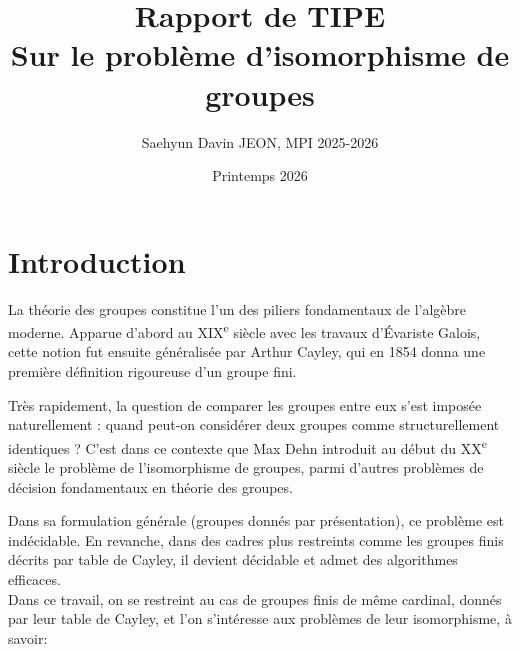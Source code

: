 \documentclass[12pt]{article}
\title{Rapport de TIPE \\
Sur le problème d'isomorphisme de groupes}
\author{Saehyun Davin JEON, MPI 2025-2026}
\date{Printemps 2026}
\begin{document}
\maketitle

\renewcommand{\contentsname}{Sommaire}
\tableofcontents

\newpage

\section{Introduction}

La théorie des groupes constitue l'un des piliers fondamentaux de l'algèbre moderne. 
Apparue d'abord au XIX\textsuperscript{e} siècle avec les travaux d'Évariste Galois, cette notion fut ensuite généralisée par Arthur Cayley, qui en 1854 donna une première définition rigoureuse d'un groupe fini.

Très rapidement, la question de comparer les groupes entre eux s’est imposée naturellement : quand peut-on considérer deux groupes comme structurellement identiques ? C’est dans ce contexte que Max Dehn introduit au début du XX\textsuperscript{e} siècle le problème de l’isomorphisme de groupes, parmi d’autres problèmes de décision fondamentaux en théorie des groupes.

Dans sa formulation générale (groupes donnés par présentation), ce problème est indécidable. En revanche, dans des cadres plus restreints comme les groupes finis décrits par table de Cayley, il devient décidable et admet des algorithmes efficaces. \\

Dans ce travail, on se restreint au cas de groupes finis de même cardinal, donnés par leur table de Cayley, et l’on s’intéresse aux problèmes de leur isomorphisme, à savoir:

\begin{center}
\end{center}
\end{document}
